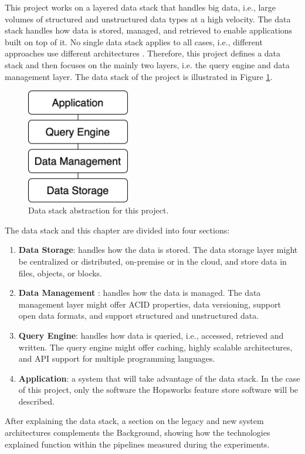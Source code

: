 This project works on a layered data stack that handles big data, i.e., large volumes of structured and unstructured data types at a high velocity. The data stack handles how data is stored, managed, and retrieved to enable applications built on top of it. 
No single data stack applies to all cases, i.e., different approaches use different architectures \cite{framptonCompleteGuideOpen2018,sakrBigDataProcessing2017}. Therefore, this project defines a data stack and then focuses on the mainly two layers, i.e. the query engine and data management layer. The data stack of the project is illustrated in Figure \ref{fig:data_stack}.

\begin{figure}[!ht]
    \begin{center}
      \includegraphics[width=0.4\textwidth]{figures/2-background/data_stack.png}
    \end{center}
    \caption[Data stack abstraction]{Data stack abstraction for this project.}
    \label{fig:data_stack}
\end{figure}
The data stack and this chapter are divided into four sections:
\begin{enumerate}
    \item \textbf{Data Storage}: handles how the data is stored. The data storage layer might be centralized or distributed, on-premise or in the cloud, and store data in files, objects, or blocks.
    \item \textbf{Data Management} : handles how the data is managed. The data management layer might offer \gls{ACID} properties, data versioning, support open data formats, and support structured and unstructured data.
    \item \textbf{Query Engine}: handles how data is queried, i.e., accessed, retrieved and written. The query engine might offer caching, highly scalable architectures, and \gls{API} support for multiple programming languages.
    \item \textbf{Application}: a system that will take advantage of the data stack. In the case of this project, only the software the Hopsworks feature store software will be described. 
\end{enumerate}
After explaining the data stack, a section on the legacy and new system architectures complements the Background, showing how the technologies explained function within the pipelines measured during the experiments.
